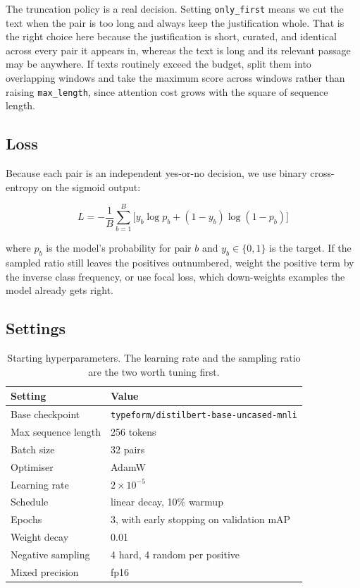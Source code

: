 \documentclass[11pt]{article}
\begin{document}
The truncation policy is a real decision. Setting \texttt{only\_first} means we
cut the text when the pair is too long and always keep the justification whole.
That is the right choice here because the justification is short, curated, and
identical across every pair it appears in, whereas the text is long and its
relevant passage may be anywhere. If texts routinely exceed the budget, split
them into overlapping windows and take the maximum score across windows rather
than raising \texttt{max\_length}, since attention cost grows with the square of
sequence length.

\subsection{Loss}

Because each pair is an independent yes-or-no decision, we use binary
cross-entropy on the sigmoid output:

\begin{equation}
L = -\frac{1}{B}\sum_{b=1}^{B}
\Big[ y_b \log p_b + (1 - y_b)\log(1 - p_b) \Big]
\end{equation}

\noindent where $p_b$ is the model's probability for pair $b$ and $y_b \in
\{0,1\}$ is the target. If the sampled ratio still leaves the positives
outnumbered, weight the positive term by the inverse class frequency, or use
focal loss, which down-weights examples the model already gets right.

\subsection{Settings}

\begin{table}[H]
\centering
\small
\begin{tabular}{ll}
\toprule
\textbf{Setting} & \textbf{Value} \\
\midrule
Base checkpoint & \texttt{typeform/distilbert-base-uncased-mnli} \\
Max sequence length & 256 tokens \\
Batch size & 32 pairs \\
Optimiser & AdamW \\
Learning rate & $2\times10^{-5}$ \\
Schedule & linear decay, 10\% warmup \\
Epochs & 3, with early stopping on validation mAP \\
Weight decay & 0.01 \\
Negative sampling & 4 hard, 4 random per positive \\
Mixed precision & fp16 \\
\bottomrule
\end{tabular}
\caption{Starting hyperparameters. The learning rate and the sampling ratio are
the two worth tuning first.}
\end{table}
\end{document}
